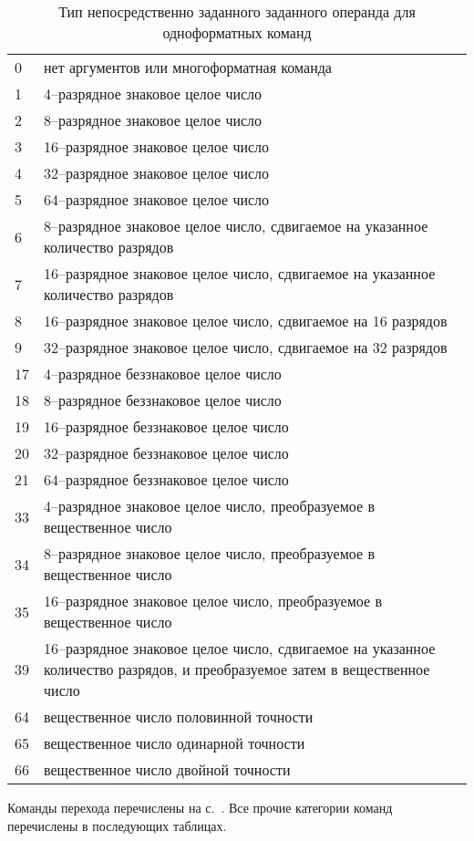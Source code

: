 \documentclass[forwardcom.tex]{subfiles}
\begin{document}
\begin{longtable} {|l|p{140mm}|}
\caption{Тип непосредственно заданного заданного операнда для одноформатных команд} 
\label{table:immediateOperantTypesInInstructionList}
\\
\endfirsthead
\endhead
\hline
0  & нет аргументов или многоформатная команда \\
1  & 4--разрядное знаковое целое число \\
2  & 8--разрядное знаковое целое число \\
3  & 16--разрядное знаковое целое число \\
4  & 32--разрядное знаковое целое число \\
5  & 64--разрядное знаковое целое число \\
6  & 8--разрядное знаковое целое число, сдвигаемое на указанное количество разрядов \\
7  & 16--разрядное знаковое целое число, сдвигаемое на указанное количество разрядов \\
8  & 16--разрядное знаковое целое число, сдвигаемое на 16 разрядов \\
9  & 32--разрядное знаковое целое число, сдвигаемое на 32 разрядов \\
17 & 4--разрядное беззнаковое целое число \\
18 & 8--разрядное беззнаковое целое число \\
19 & 16--разрядное беззнаковое целое число \\
20 & 32--разрядное беззнаковое целое число \\
21 & 64--разрядное беззнаковое целое число \\
33 & 4--разрядное знаковое целое число, преобразуемое в вещественное число \\
34 & 8--разрядное знаковое целое число, преобразуемое в вещественное число \\
35 & 16--разрядное знаковое целое число, преобразуемое в вещественное число \\
39 & 16--разрядное знаковое целое число, сдвигаемое на указанное количество разрядов, и преобразуемое затем в вещественное число \\
64 & вещественное число половинной точности \\
65 & вещественное число одинарной точности \\
66 & вещественное число двойной точности \\ \hline
\end{longtable}

Команды перехода перечислены на с.~\pageref{table:controlTransferInstructions}. Все прочие категории команд перечислены в последующих таблицах.
\end{document}
